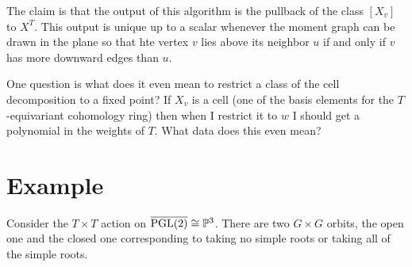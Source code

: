 \documentclass[12pt]{article}
\begin{document}
\hfill

The claim is that the output of this algorithm is the pullback of the class $[X_v]$ to $X^T$. This output is
unique up to a scalar whenever the moment graph can be drawn in the plane so that hte vertex $v$ lies above its neighbor $u$ if and only if $v$ has more
downward edges than $u$.

\hfill

One question is what does it even mean to restrict a class of the cell decomposition
to a fixed point? If $X_v$ is a cell (one of the basis elements for the $T$-equivariant cohomology ring) then
when I restrict it to $w$ I should get a polynomial in the weights of $T$. What data does this even mean?

\section{Example}
Consider the $T\times T$ action on $\overline{\operatorname{PGL}(2)} \cong \mathbb{P}^3$. There are two $G\times G$ orbits,
the open one and the closed one corresponding to taking no simple roots or taking all of the simple roots.

\hfill
\end{document}
